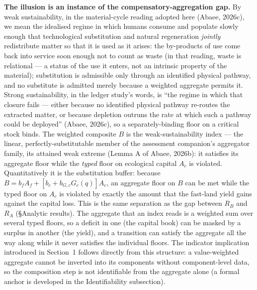 \documentclass[11pt]{article}
\begin{document}
\noindent\textbf{The illusion is an instance of the compensatory-aggregation gap.} By weak sustainability, in the material-cycle reading adopted here (Abaee, 2026c), we mean the idealised regime in which humans consume and populate slowly enough that technological substitution and natural regeneration \emph{jointly} redistribute matter so that it is used as it arises: the by-products of use come back into service soon enough not to count as waste (in that reading, waste is relational --- a status of the use it enters, not an intrinsic property of the material); substitution is admissible only through an identified physical pathway, and no substitute is admitted merely because a weighted aggregate permits it. Strong sustainability, in the ledger study's words, is ``the regime in which that closure fails --- either because no identified physical pathway re-routes the extracted matter, or because depletion outruns the rate at which such a pathway could be deployed'' (Abaee, 2026c), so a separately-binding floor on a critical stock binds. The weighted composite $B$ is the weak-sustainability index --- the linear, perfectly-substitutable member of the assessment companion's aggregator family, its attained weak extreme (Lemma A of Abaee, 2026b): it satisfies its aggregate floor while the \emph{typed} floor on ecological capital $A_c$ is violated. Quantitatively it is the substitution buffer: because $B=b_fA_f+[b_c+b_{G,c}G_c(q)]A_c$, an aggregate floor on $B$ can be met while the typed floor on $A_c$ is violated by exactly the amount that the fast-land yield gains against the capital loss. This is the same separation as the gap between $R_B$ and $R_A$ (\S Analytic results). The aggregate that an index reads is a weighted sum over several typed floors, so a deficit in one (the capital book) can be masked by a surplus in another (the yield), and a transition can satisfy the aggregate all the way along while it never satisfies the individual floors. The indicator implication introduced in Section~1 follows directly from this structure: a value-weighted aggregate cannot be inverted into its components without component-level data, so the composition step is not identifiable from the aggregate alone (a formal anchor is developed in the Identifiability subsection).
\end{document}
